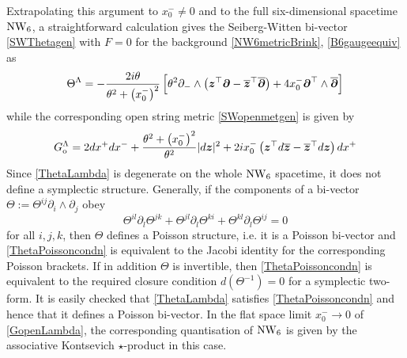 Extrapolating this argument to $x_0^-\neq0$ and to the full six-dimensional
spacetime $\operatorname{NW}_6$, a straightforward calculation gives the Seiberg-Witten
bi-vector \eqref{SWThetagen} with $F=0$ for the background
\eqref{NW6metricBrink}, \eqref{B6gaugeequiv} as
\begin{equation}
  \label{ThetaLambda}
  \Theta^\Lambda=- \frac{2 i\theta}{\theta^2+\left(x_0^-\right)^2}  
  \left[\theta^2 \partial_-\wedge\left({{\boldsymbol {z} }}^\top {{\boldsymbol {\partial} }}-
      \overline{{{\boldsymbol {z} }}}{}^{ \top} \overline{{{\boldsymbol {\partial} }}} \right)+4x_0^- 
    {{\boldsymbol {\partial} }}^\top\wedge\overline{{{\boldsymbol {\partial} }}} \right]
\end{equation}
while the corresponding open string metric \eqref{SWopenmetgen} is given by
\begin{equation}
  \label{GopenLambda}
  G_{\rm o}^\Lambda=2  d x^+  d x^-+ \frac{\theta^2+\left(x_0^-
    \right)^2}{\theta^2}  | d{{\boldsymbol {z} }}|^2+2 i x_0^- \left({{\boldsymbol {z} }}^\top  d
    \overline{{{\boldsymbol {z} }}}-\overline{{{\boldsymbol {z} }}}{}^{ \top}  d{{\boldsymbol {z} }}\right)  d x^+
\end{equation}
Since \eqref{ThetaLambda} is degenerate on the whole $\operatorname{NW}_6$ spacetime, it does
not define a symplectic structure. Generally, if the components of a bi-vector
$\Theta:=\Theta^{ij} \partial_i\wedge\partial_j$ obey
\begin{equation}
  \label{ThetaPoissoncondn}
  \Theta^{il} \partial_l\Theta^{jk}+\Theta^{jl} \partial_l\Theta^{ki}+
  \Theta^{kl} \partial_l\Theta^{ij}=0
\end{equation}
for all $i,j,k$, then $\Theta$ defines a Poisson structure, i.e. it is a Poisson
bi-vector and \eqref{ThetaPoissoncondn} is equivalent to the Jacobi identity for
the corresponding Poisson brackets. If in addition $\Theta$ is invertible, then
\eqref{ThetaPoissoncondn} is equivalent to the required closure condition $
d(\Theta^{-1})=0$ for a symplectic two-form. It is easily checked that
\eqref{ThetaLambda} satisfies \eqref{ThetaPoissoncondn} and hence that it
defines a Poisson bi-vector. In the flat space limit $x_0^-\to0$ of
\eqref{GopenLambda}, the corresponding quantisation of $\operatorname{NW}_6$ is given by the
associative Kontsevich $\star$-product \cite{Kont1} in this case.

